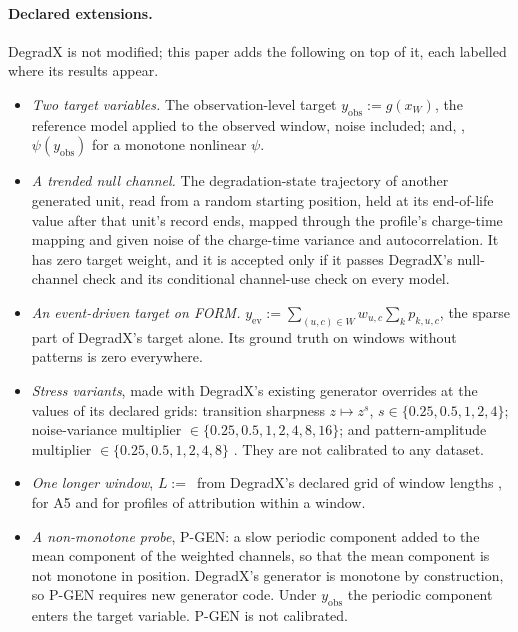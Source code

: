 \documentclass{article}
\begin{document}
\paragraph{Declared extensions.} DegradX is not modified; this paper adds the following on top of it, each labelled where its results appear.
\begin{itemize}
\item \emph{Two target variables.} The observation-level target $y_{\mathrm{obs}} := g(x_W)$, the reference model applied to the observed window, noise included; and, , $\psi(y_{\mathrm{obs}})$ for a monotone nonlinear $\psi$.
\item \emph{A trended null channel.} The degradation-state trajectory of another generated unit, read from a random starting position, held at its end-of-life value after that unit's record ends, mapped through the profile's charge-time mapping and given noise of the charge-time variance and autocorrelation. It has zero target weight, and it is accepted only if it passes DegradX's null-channel check and its conditional channel-use check on every model.
\item \emph{An event-driven target on FORM.} $y_{\mathrm{ev}} := \sum_{(u,c)\in W} w_{u,c}\sum_k p_{k,u,c}$, the sparse part of DegradX's target alone. Its ground truth on windows without patterns is zero everywhere.
\item \emph{Stress variants}, made with DegradX's existing generator overrides at the values of its declared grids: transition sharpness $z\mapsto z^s$, $s\in\{0.25,0.5,1,2,4\}$; noise-variance multiplier $\in\{0.25,0.5,1,2,4,8,16\}$; and pattern-amplitude multiplier $\in\{0.25,0.5,1,2,4,8\}$ \citep{degradxrepo}. They are not calibrated to any dataset.
\item \emph{One longer window}, $L:=$\, from DegradX's declared grid of window lengths \citep{degradxrepo}, for A5 and for profiles of attribution within a window.
\item \emph{A non-monotone probe}, P-GEN: a slow periodic component added to the mean component of the weighted channels, so that the mean component is not monotone in position. DegradX's generator is monotone by construction, so P-GEN requires new generator code. Under $y_{\mathrm{obs}}$ the periodic component enters the target variable. P-GEN is not calibrated.
\end{itemize}
\end{document}
